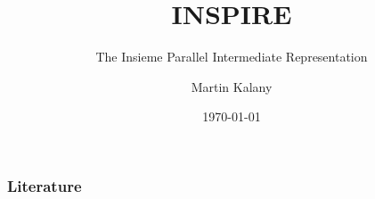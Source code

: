 \documentclass{beamer}
\title{INSPIRE}
\subtitle{The Insieme Parallel Intermediate Representation}
\author{Martin Kalany}
\institute
{
  Graduate student in Computer Science\\
  Vienna University of Technology\\
}
\date{\today}
\begin{document}
\maketitle


\begin{frame}
\cite{JordanPTKF13}
\end{frame}

\begin{frame}[allowframebreaks]
\frametitle<presentation>{Literature}    
\printbibliography
\end{frame} 	 
\end{document}
